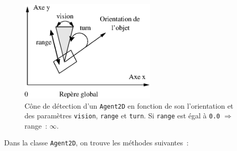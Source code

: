 \documentclass[12pt]{article}
\begin{document}
\begin{figure}[hbtp]
\begin{center}
\includegraphics[width=6.5cm]{fig/cone}
\end{center}
\caption{C\^one de d\'etection d'un {\tt Agent2D} en fonction de son
l'orientation et des param\`etres {\tt vision}, {\tt range} et {\tt turn}.
Si {\tt range} est \'egal \`a {\tt 0.0} $\Longrightarrow$ range~: $\infty$.}
\end{figure}

\vspace{0.3cm}
Dans la classe {\tt Agent2D}, on trouve les m\'ethodes suivantes~:
\end{document}
